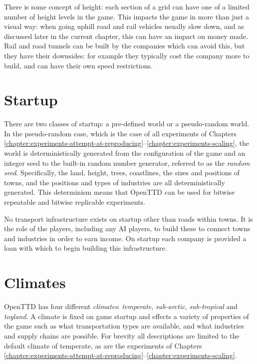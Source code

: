 \documentclass[logo,msc,dsti]{style/infthesis}    %
\begin{document}
{There is some concept of height: each section of a grid can have one of a limited number of height levels in the game. This impacts the game in more than just a visual way: when going uphill road and rail vehicles usually slow down, and as discussed later in the current chapter, this can have an impact on money made. Rail and road tunnels can be built by the companies which can avoid this, but they have their downsides: for example they typically cost the company more to build, and can have their own speed restrictions.

\section{Startup}

There are two classes of startup: a pre-defined world or a pseudo-random world. In the pseudo-random case, which is the case of all experiments of Chapters \ref{chapter:experiments-attempt-at-reproducing}--\ref{chapter:experiments-scaling}, the world is deterministically generated from  the configuration of the game and an integer seed to the built-in random number generator, referred to as the \emph{random seed}. Specifically, the land, height, trees, coastlines, the sizes and positions of towns, and the positions and types of industries are all deterministically generated. This determinism means that OpenTTD can be used for bitwise repeatable and bitwise replicable experiments.

No transport infrastructure exists on startup other than roads within towns. It is the role of the players, including any AI players, to build these to connect towns and industries in order to earn income. On startup each company is provided a loan with which to begin building this infrastructure.

\section{Climates}

OpenTTD has four different \emph{climates}: \emph{temperate}, \emph{sub-arctic}, \emph{sub-tropical} and \emph{toyland}. A climate is fixed on game startup and effects a variety of properties of the game such as what transportation types are available, and what industries and supply chains are possible. For brevity all descriptions are limited to the default climate of temperate, as are the experiments of Chapters \ref{chapter:experiments-attempt-at-reproducing}--\ref{chapter:experiments-scaling}.

}
\end{document}
